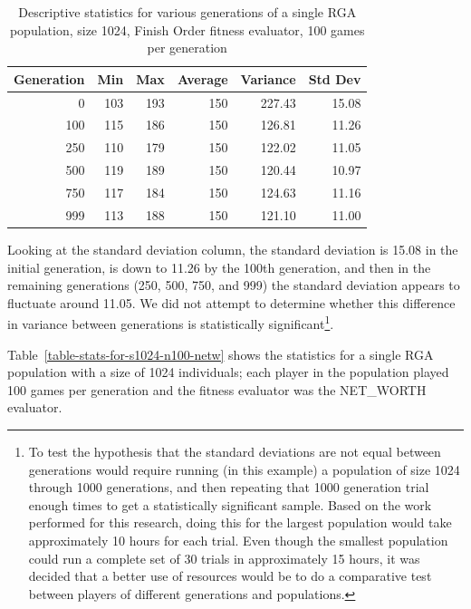 \begin{table}[ht]
\begin{center}
\begin{tabular}{ | r || r | r | r | r | r |}
\hline                        
Generation & Min & Max & Average & Variance & Std Dev \\ \hline \hline
0   & 103 & 193 & 150 & 227.43 & 15.08 \\ \hline
100 & 115 & 186 & 150 & 126.81 & 11.26 \\ \hline 
250 & 110 & 179 & 150 & 122.02 & 11.05 \\ \hline
500 & 119 & 189 & 150 & 120.44 & 10.97 \\ \hline
750 & 117 & 184 & 150 & 124.63 & 11.16 \\ \hline
999 & 113 & 188 & 150 & 121.10 & 11.00 \\ \hline
\end{tabular}
\caption[RGA, Finish Order, statistics]{Descriptive statistics for various
generations of a single RGA population, size 1024, Finish Order fitness
evaluator, 100 games per generation}
\label{table-stats-for-s1024-n100-fo}
\end{center}
\end{table}
Looking at the standard deviation column, the standard deviation is 15.08 in the
initial generation, is down to 11.26 by the 100th generation, and then in the
remaining generations (250, 500, 750, and 999) the standard deviation appears to
fluctuate around 11.05. We did not attempt to determine whether this difference
in variance between generations is statistically significant\footnote{To test
the hypothesis that the standard deviations are not equal between generations
would require running (in this example) a population of size 1024 through 1000
generations, and then repeating that 1000 generation trial enough times to
get a statistically significant sample. Based on the work performed for this
research, doing this for the largest population would take approximately 10
hours for each trial. Even though the smallest population could run a complete
set of 30 trials in approximately 15 hours, it was decided that a better use of
resources would be to do a comparative test between players of different
generations and populations.}.

Table~\ref{table-stats-for-s1024-n100-netw} shows the statistics for a single
RGA population with a size of 1024 individuals; each player in the population
played 100 games per generation and the fitness evaluator was the NET\_WORTH
evaluator.

